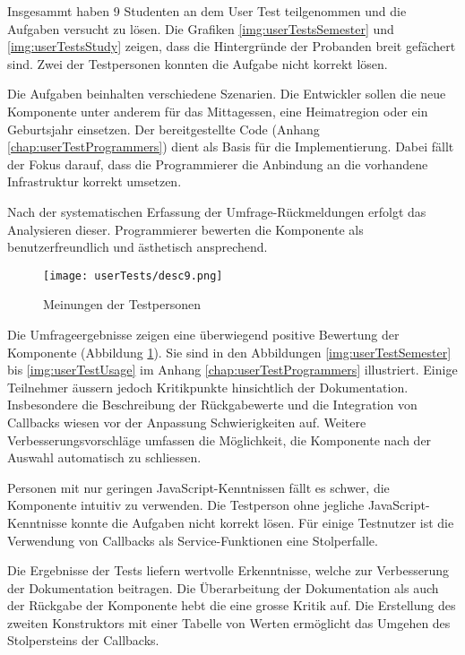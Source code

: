 Insgesammt haben 9 Studenten an dem User Test teilgenommen und die Aufgaben versucht zu lösen. 
Die Grafiken \ref{img:userTestsSemester} und \ref{img:userTestsStudy} zeigen, dass die Hintergründe der Probanden breit gefächert sind. 
Zwei der Testpersonen konnten die Aufgabe nicht korrekt lösen. 

Die Aufgaben beinhalten verschiedene Szenarien. 
Die Entwickler sollen die neue Komponente unter anderem für das Mittagessen, eine Heimatregion oder ein Geburtsjahr einsetzen. 
Der bereitgestellte Code (Anhang \ref{chap:userTestProgrammers}) dient als Basis für die Implementierung. 
Dabei fällt der Fokus darauf, dass die Programmierer die Anbindung an die vorhandene Infrastruktur korrekt umsetzen. 

Nach der systematischen Erfassung der Umfrage-Rückmeldungen erfolgt das Analysieren dieser. 
Programmierer bewerten die Komponente als benutzerfreundlich und ästhetisch ansprechend. 

\begin{figure}[!htb]
    \centering
    \texttt{[image: userTests/desc9.png]}
    \caption{\centering Meinungen der Testpersonen}
    \label{img:userTestsDescription}
\end{figure}

Die Umfrageergebnisse zeigen eine überwiegend positive Bewertung der Komponente (Abbildung \ref{img:userTestsDescription}). 
Sie sind in den Abbildungen \ref{img:userTestSemester} bis \ref{img:userTestUsage} im Anhang \ref{chap:userTestProgrammers} illustriert. 
Einige Teilnehmer äussern jedoch Kritikpunkte hinsichtlich der Dokumentation. 
Insbesondere die Beschreibung der Rückgabewerte und die Integration von Callbacks wiesen vor der Anpassung Schwierigkeiten auf. 
Weitere Verbesserungsvorschläge umfassen die Möglichkeit, die Komponente nach der Auswahl automatisch zu schliessen. 

Personen mit nur geringen JavaScript-Kenntnissen fällt es schwer, die Komponente intuitiv zu verwenden. 
Die Testperson ohne jegliche JavaScript-Kenntnisse konnte die Aufgaben nicht korrekt lösen. 
Für einige Testnutzer ist die Verwendung von Callbacks als Service-Funktionen eine Stolperfalle. 

Die Ergebnisse der Tests liefern wertvolle Erkenntnisse, welche zur Verbesserung der Dokumentation beitragen. 
Die Überarbeitung der Dokumentation als auch der Rückgabe der Komponente hebt die eine grosse Kritik auf. 
Die Erstellung des zweiten Konstruktors mit einer Tabelle von Werten ermöglicht das Umgehen des Stolpersteins der Callbacks. 

